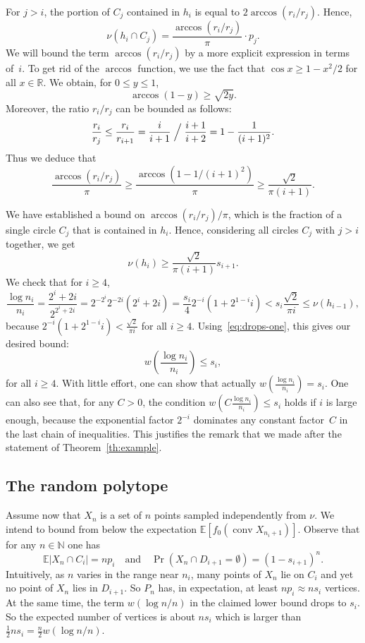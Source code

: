 \documentclass[AHL,Unicode,longabstracts]{cedram}
\DeclareMathOperator{\conv}{conv}
\newcommand{\wet}[1]{w(#1)}
\newcommand{\Nbb}{\mathbb{N}}%
\newcommand{\Rbb}{\mathbb{R}}%
\newcommand{\Ebb}{\mathbb{E}}%
\newcommand{\ptb}[1]{\left[#1 \right]}
\newcommand*{\mtfrac}[2]{\frac{#1}{#2}}%
\begin{document}
For $j > i$, the portion of $C_j$ contained in $h_i$ is equal to $2\arccos(r_i/r_j)$. Hence,
\[
\nu(h_i\cap C_j)=\frac{\arccos(r_i/r_j)}{\pi} \cdot p_j.
\]
We will bound the term $\arccos(r_i/r_j)$ by a more explicit expression in terms of~$i$. To get rid of the $\arccos$ function, we use the fact that $\cos x \ge 1-x^2/2$ for all $x\in\Rbb$. We obtain, for $0\le y\le1$,
\[
\arccos (1-y)\ge \sqrt{2y}.
\]
Moreover, the ratio ${r_i}/{r_{j}}$ can be bounded as follows:
\[
\frac{r_i}{r_j}\le\frac{r_i}{r_{i+1}} =\frac i{i+1} \Bigm/\frac {i+1}{i+2} = 1-\frac{1}{(i+1)^2}.
\]
Thus we deduce that
\[
\frac{\arccos(r_i/r_j)}{\pi} \ge\frac{\arccos(1- 1/{(i+1)^2})}{\pi} \ge \frac{\sqrt{2}}{\pi(i+1)}.
\]

We have established a bound on ${\arccos(r_i/r_j)}/{\pi}$, which is the fraction of a single circle $C_j$ that is contained in $h_i$. Hence, considering all circles $C_j$ with $j>i$ together, we get
\[
\nu(h_i)\ge \frac{\sqrt{2}}{\pi(i+1)}s_{i+1}.
\]
We check that for $i\ge 4$,
\[
\frac{\log n_i}{n_i}=\frac{2^{i}+2i}{2^{2^i+2i}} =2^{-2^i}2^{-2i} (2^{i}+2i) =\frac{s_i}4 2^{-i}(1+2^{1-i}i)< s_i \frac{\sqrt{2}}{\pi i}\le \nu(h_{i-1}),
\]
because $2^{-i}(1+2^{1-i}i) < \frac{\sqrt{2}}{\pi i}$ for all $i\ge 4$. Using~\eqref{eq:drops-one}, this gives our desired bound:
\[
w\left(\mtfrac{\log n_i}{n_i}\right) \le s_i,
\]
for all $i\ge 4$. With little effort, one can show that actually $\wet {\mtfrac{\log n_i}{n_i}} = s_i$. One can also see that, for any $C>0$, the condition $\wet {C\mtfrac{\log n_i}{n_i}}\le s_i $ holds if $i$ is large enough, because the exponential factor $2^{-i}$ dominates any constant factor~$C$ in the last chain of inequalities. This justifies the remark that we made after the statement of Theorem~\ref{th:example}.



\subsection{The random polytope}\label{random}

Assume now that $X_n$ is a set of $n$ points sampled independently from $\nu$. We intend to bound from below the expectation $\Ebb\ptb{f_0(\conv X_{n_i+1})}$. Observe that for any $n
\in\Nbb$ one has
\[
\Ebb|X_n\cap C_i|=np_i\quad\text{and}\quad \Pr(X_n\cap D_{i+1}=\emptyset)=(1-s_{i+1})^n.
\]
Intuitively, as $n$ varies in the range near $n_i$, many points of $X_n$ lie on $C_i$ and yet no point of $X_n$ lies in $D_{i+1}$. So $P_n$ has, in expectation, at least $np_i \approx ns_i$ vertices. At the same time, the term $\wet {\log n/n}$ in the claimed lower bound drops to $s_i$. So the expected number of vertices is about $ns_i$ which is larger than $\frac 12 ns_i=\frac n2 \wet {\log n/n}$.
\end{document}
